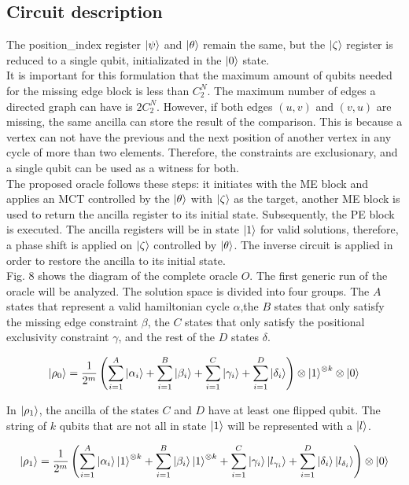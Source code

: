 \documentclass[10pt,a4paper]{article}
\begin{document}
\subsection{Circuit description}
The position\_index register $\ket{\psi}$ and $\ket{\theta}$ remain the same, but the $\ket{\zeta}$ register is reduced to a single qubit, initializated in the $\ket{0}$ state.\\
It is important for this formulation that the maximum amount of qubits needed for the missing edge block is less than $C^N_2$. The maximum number of edges a directed graph can have is $2C^N_2$. However, if both edges $(u, v)$ and $(v, u)$ are missing, the same ancilla can store the result of the comparison. This is because a vertex can not have the previous and the next position of another vertex in any cycle of more than two elements. Therefore, the constraints are exclusionary, and a single qubit can be used as a witness for both.\\
The proposed oracle follows these steps: it initiates with the ME block and applies an MCT controlled by the $\ket{\theta}$ with $\ket{\zeta}$ as the target, another ME block is used to return the ancilla register to its initial state. Subsequently, the PE block is executed. The ancilla registers will be in state $\ket{1}$ for valid solutions, therefore, a phase shift is applied on $\ket{\zeta}$ controlled by $\ket{\theta}$. The inverse circuit is applied in order to restore the ancilla to its initial state.\\
Fig. 8 shows the diagram of the complete oracle $O$. The first generic run of the oracle will be analyzed. The solution space is divided into four groups. The $A$ states that represent a valid hamiltonian cycle $\alpha$,the $B$ states that only satisfy the missing edge constraint $\beta$, the $C$ states that only satisfy the positional exclusivity constraint $\gamma$, and the rest of the $D$ states $\delta$.

$$
\ket{\rho_0} = \frac{1}{2^m} \left( \sum_{i=1}^{A} \ket{\alpha_i} + \sum_{i=1}^{B} \ket{\beta_i} + \sum_{i=1}^{C} \ket{\gamma_i} + \sum_{i=1}^{D} \ket{\delta_i} \right) \otimes \ket{1}^{\otimes k} \otimes \ket{0}
$$

In $\ket{\rho_1}$, the ancilla of the states $C$ and $D$ have at least one flipped qubit. The string of $k$ qubits that are not all in state $\ket{1}$ will be represented with a $\ket{l}$.

$$
\ket{\rho_1} = \frac{1}{2^m} \left( \sum_{i=1}^{A} \ket{\alpha_i} \ket{1}^{\otimes k} + \sum_{i=1}^{B} \ket{\beta_i} \ket{1}^{\otimes k} + \sum_{i=1}^{C} \ket{\gamma_i} \ket{l_{\gamma_i}} + \sum_{i=1}^{D} \ket{\delta_i} \ket{l_{\delta_i}} \right) \otimes \ket{0}
$$
\end{document}

